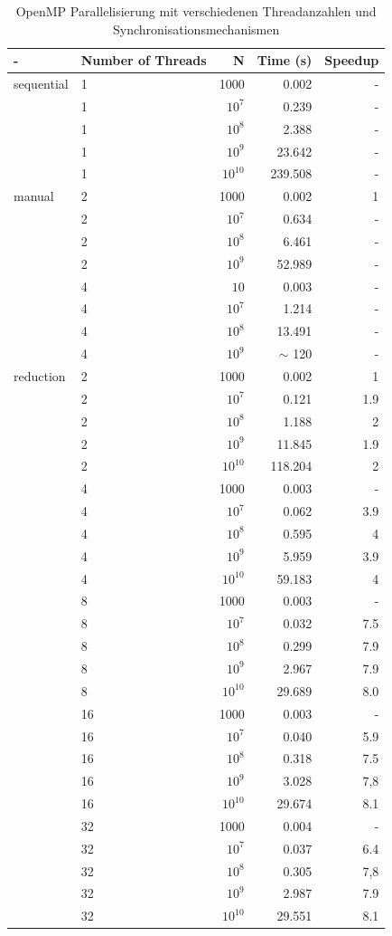 \documentclass{report}
\begin{document}
   \begin{table}     
   	\centering
	\begin{tabular}{|l|l|r|r|r|}
		\hline
		- & Number of Threads & N & Time (s) & Speedup \\
		\hline
		sequential & 1 & 1000 & 0.002 & - \\
		& 1 & $10^{7}$ & 0.239 & - \\
		& 1 & $10^{8}$ & 2.388 & - \\
		& 1 & $10^{9}$ & 23.642 & - \\
		& 1 & $10^{10}$ & 239.508 & - \\
		\hline
		manual & 2 & 1000 & 0.002 & 1 \\
		 & 2 & $10^{7}$ & 0.634 & - \\
		 & 2 & $10^{8}$ & 6.461 & - \\
		 & 2 & $10^{9}$ & 52.989 & - \\
		 & 4 & $10$ & 0.003 & - \\
		 & 4 & $10^{7}$ & 1.214 & - \\
		 & 4 & $10^{8}$ & 13.491 & - \\
		 & 4 & $10^{9}$ & $\sim$ 120 & - \\
		\hline
		reduction & 2 & 1000 & 0.002 & 1 \\
		 & 2 & $10^{7}$ & 0.121 & 1.9 \\
		 & 2 & $10^{8}$ & 1.188 & 2 \\
		 & 2 & $10^{9}$ & 11.845 & 1.9 \\
		 & 2 & $10^{10}$ & 118.204 & 2 \\
		 & 4 & 1000 & 0.003 & - \\
		 & 4 & $10^{7}$ & 0.062 & 3.9 \\
		 & 4 & $10^{8}$ & 0.595 & 4 \\
		 & 4 & $10^{9}$ & 5.959 & 3.9 \\
		 & 4 & $10^{10}$ & 59.183 & 4 \\
		 & 8 & 1000 & 0.003 & - \\
		 & 8 & $ 10^{7} $ & 0.032 & 7.5 \\
		 & 8 & $ 10^{8} $ & 0.299 & 7.9 \\
		 & 8 & $ 10^{9} $ & 2.967 & 7.9 \\
		 & 8 & $10^{10}$ & 29.689 & 8.0 \\
		 & 16 & 1000 & 0.003 & - \\
		 & 16 & $ 10^{7} $ & 0.040 & 5.9 \\
		 & 16 & $ 10^{8} $ & 0.318 & 7.5 \\
		 & 16 & $ 10^{9} $ & 3.028 & 7,8 \\
		 & 16 & $10^{10}$ & 29.674 & 8.1\\
		 & 32 & 1000 & 0.004 & - \\
		 & 32 & $ 10^{7} $ & 0.037 & 6.4 \\
		 & 32 & $ 10^{8} $ & 0.305 & 7,8 \\
		 & 32 & $ 10^{9} $ & 2.987 & 7.9 \\
		 & 32 & $10^{10}$ & 29.551 & 8.1 \\
		\hline
	\end{tabular}
	\caption{OpenMP Parallelisierung mit verschiedenen Threadanzahlen und Synchronisationsmechanismen}
	\label{Table:1b}
\end{table}
	\newpage
\end{document}
